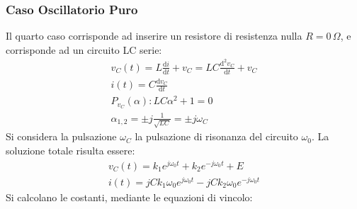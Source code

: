 \documentclass{article}
\newcommand{\df}{\mathrm{d}}
\numberwithin{equation}{subsection}
\begin{document}
\subsubsection{Caso Oscillatorio Puro}

Il quarto caso corrisponde ad inserire un resistore di resistenza nulla $R=0\,\Omega$, e corrisponde ad un circuito LC serie:
\begin{gather*}
    v_C(t)=L\displaystyle\frac{\df i}{\df t}+v_C=LC\frac{\df^2v_C}{\df t}+v_C\\
    i(t)=C\displaystyle\frac{\df v_C}{\df t}\\
    P_{v_C}(\alpha):LC\alpha^2+1=0\\
    \alpha_{1,2}=\displaystyle\pm j\frac{1}{\sqrt{LC}}=\pm j\omega_C
\end{gather*}
Si considera la pulsazione $\omega_C$ la pulsazione di risonanza del circuito $\omega_0$. 
La soluzione totale risulta essere:
\begin{gather*}
    v_C(t)=k_1e^{j\omega_0t}+k_2e^{-j\omega_0t}+E\\
    i(t)=jCk_1\omega_0e^{j\omega_0t}-jCk_2\omega_0e^{-j\omega_0t}
\end{gather*}
Si calcolano le costanti, mediante le equazioni di vincolo:
\end{document}
